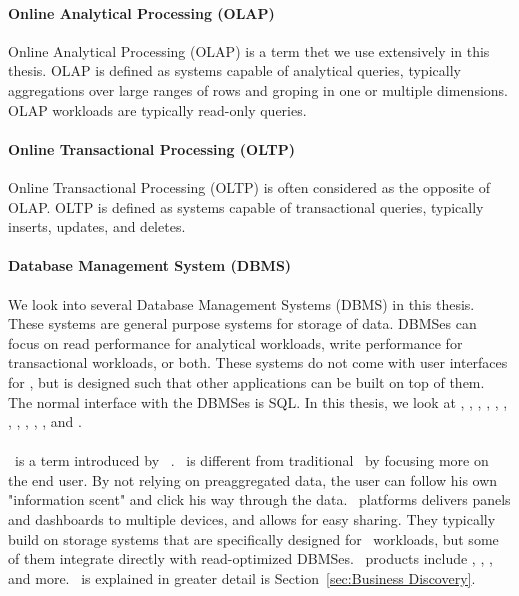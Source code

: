 \paragraph{Online Analytical Processing (OLAP)}
\label{par:Online Analytical Processing (OLAP)}
Online Analytical Processing (OLAP) is a term thet we use extensively in this thesis. OLAP is defined as systems capable of analytical queries, typically aggregations over large ranges of rows and groping in one or multiple dimensions. OLAP workloads are typically read-only queries.

\paragraph{Online Transactional Processing (OLTP)}
\label{par:Online Transactional Processing (OLTP)}
Online Transactional Processing (OLTP) is often considered as the opposite of OLAP. OLTP is defined as systems capable of transactional queries, typically inserts, updates, and deletes. 

\paragraph{Database Management System (DBMS)}
\label{par:Database Management System (DBMS)}
We look into several Database Management Systems (DBMS) in this thesis. These systems are general purpose systems for storage of data. DBMSes can focus on read performance for analytical workloads, write performance for transactional workloads, or both. These systems do not come with user interfaces for \bd, but is designed such that other applications can be built on top of them. The normal interface with the DBMSes is SQL. In this thesis, we look at \oracle, \ibm, \saph, \sapnw, \mssql, \cstore, \vertica, \blink, \exasol, \oracle, \hyper, and \hyrise.

\paragraph{\bd}
\label{par:Business Discovery}
\bd~is a term introduced by \qlikview~\cite{Qlik2014-vd}. \bd~is different from traditional \bi~by focusing more on the end user. By not relying on preaggregated data, the user can follow his own "information scent" and click his way through the data. \bd~platforms delivers panels and dashboards to multiple devices, and allows for easy sharing. They typically build on storage systems that are specifically designed for \bd~workloads, but some of them integrate directly with read-optimized DBMSes. \bd~products include \tableau, \qlikview, \powerpivot, and more. \bd~is explained in greater detail is Section~\ref{sec:Business Discovery}.

